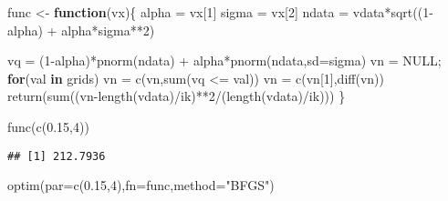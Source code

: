 \documentclass[
]{article}
\newenvironment{Shaded}{\begin{snugshade}}{\end{snugshade}}
\newcommand{\AttributeTok}[1]{\textcolor[rgb]{0.77,0.63,0.00}{#1}}
\newcommand{\ConstantTok}[1]{\textcolor[rgb]{0.00,0.00,0.00}{#1}}
\newcommand{\ControlFlowTok}[1]{\textcolor[rgb]{0.13,0.29,0.53}{\textbf{#1}}}
\newcommand{\DecValTok}[1]{\textcolor[rgb]{0.00,0.00,0.81}{#1}}
\newcommand{\FloatTok}[1]{\textcolor[rgb]{0.00,0.00,0.81}{#1}}
\newcommand{\FunctionTok}[1]{\textcolor[rgb]{0.00,0.00,0.00}{#1}}
\newcommand{\NormalTok}[1]{#1}
\newcommand{\OtherTok}[1]{\textcolor[rgb]{0.56,0.35,0.01}{#1}}
\newcommand{\SpecialCharTok}[1]{\textcolor[rgb]{0.00,0.00,0.00}{#1}}
\newcommand{\StringTok}[1]{\textcolor[rgb]{0.31,0.60,0.02}{#1}}
\begin{document}
\begin{Shaded}
\begin{Highlighting}[]
\NormalTok{func }\OtherTok{\textless{}{-}} \ControlFlowTok{function}\NormalTok{(vx)\{}
\NormalTok{  alpha }\OtherTok{=}\NormalTok{ vx[}\DecValTok{1}\NormalTok{]}
\NormalTok{  sigma }\OtherTok{=}\NormalTok{ vx[}\DecValTok{2}\NormalTok{]}
\NormalTok{  ndata }\OtherTok{=}\NormalTok{ vdata}\SpecialCharTok{*}\FunctionTok{sqrt}\NormalTok{((}\DecValTok{1}\SpecialCharTok{{-}}\NormalTok{alpha) }\SpecialCharTok{+}\NormalTok{ alpha}\SpecialCharTok{*}\NormalTok{sigma}\SpecialCharTok{**}\DecValTok{2}\NormalTok{)}

\NormalTok{  vq }\OtherTok{=}\NormalTok{ (}\DecValTok{1}\SpecialCharTok{{-}}\NormalTok{alpha)}\SpecialCharTok{*}\FunctionTok{pnorm}\NormalTok{(ndata) }\SpecialCharTok{+}\NormalTok{ alpha}\SpecialCharTok{*}\FunctionTok{pnorm}\NormalTok{(ndata,}\AttributeTok{sd=}\NormalTok{sigma)}
\NormalTok{  vn }\OtherTok{=} \ConstantTok{NULL}\NormalTok{; }\ControlFlowTok{for}\NormalTok{(val }\ControlFlowTok{in}\NormalTok{ grids) vn }\OtherTok{=} \FunctionTok{c}\NormalTok{(vn,}\FunctionTok{sum}\NormalTok{(vq }\SpecialCharTok{\textless{}=}\NormalTok{ val))}
\NormalTok{  vn }\OtherTok{=} \FunctionTok{c}\NormalTok{(vn[}\DecValTok{1}\NormalTok{],}\FunctionTok{diff}\NormalTok{(vn))}
  \FunctionTok{return}\NormalTok{(}\FunctionTok{sum}\NormalTok{((vn}\SpecialCharTok{{-}}\FunctionTok{length}\NormalTok{(vdata)}\SpecialCharTok{/}\NormalTok{ik)}\SpecialCharTok{**}\DecValTok{2}\SpecialCharTok{/}\NormalTok{(}\FunctionTok{length}\NormalTok{(vdata)}\SpecialCharTok{/}\NormalTok{ik)))}
\NormalTok{\}}

\FunctionTok{func}\NormalTok{(}\FunctionTok{c}\NormalTok{(}\FloatTok{0.15}\NormalTok{,}\DecValTok{4}\NormalTok{))}
\end{Highlighting}
\end{Shaded}

\begin{verbatim}
## [1] 212.7936
\end{verbatim}

\begin{Shaded}
\begin{Highlighting}[]
\FunctionTok{optim}\NormalTok{(}\AttributeTok{par=}\FunctionTok{c}\NormalTok{(}\FloatTok{0.15}\NormalTok{,}\DecValTok{4}\NormalTok{),}\AttributeTok{fn=}\NormalTok{func,}\AttributeTok{method=}\StringTok{"BFGS"}\NormalTok{)}
\end{Highlighting}
\end{Shaded}
\end{document}
